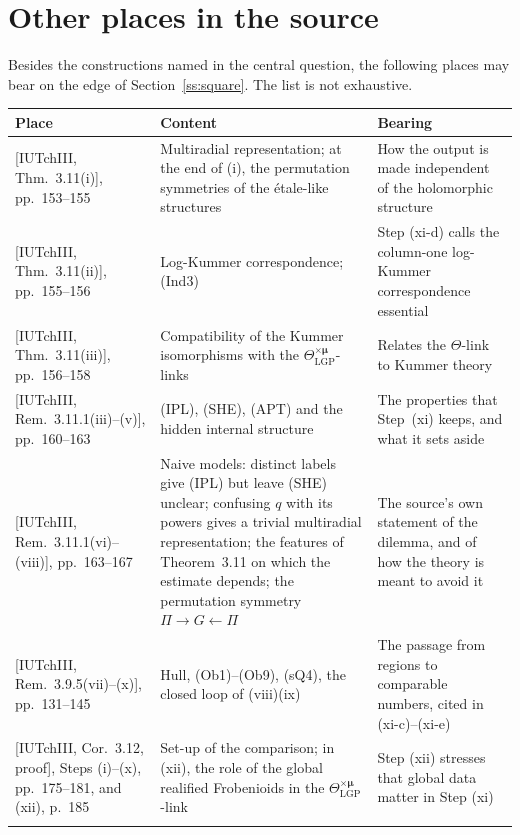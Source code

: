 \documentclass[11pt]{article}
\theoremstyle{definition}
\begin{document}
\section{Other places in the source}\label{s:places}

Besides the constructions named in the central question, the
following places may bear on the edge of Section~\ref{ss:square}.
The list is not exhaustive.

{\small
\begin{longtable}{@{}>{\raggedright\arraybackslash}p{}>{\raggedright\arraybackslash}p{}>{\raggedright\arraybackslash}p{}@{}}
\toprule
Place & Content & Bearing\\
\midrule
\endhead
{}[IUTchIII, Thm.~3.11(i)], pp.~153--155 & Multiradial representation; at the end of (i), the permutation symmetries of the \'etale-like structures & How the output is made independent of the holomorphic structure\\\addlinespace[3pt]
{}[IUTchIII, Thm.~3.11(ii)], pp.~155--156 & Log-Kummer correspondence; (Ind3) & Step (xi-d) calls the column-one log-Kummer correspondence essential\\\addlinespace[3pt]
{}[IUTchIII, Thm.~3.11(iii)], pp.~156--158 & Compatibility of the Kummer isomorphisms with the $\Theta^{\times\boldsymbol\mu}_{\mathrm{LGP}}$-links & Relates the $\Theta$-link to Kummer theory\\\addlinespace[3pt]
{}[IUTchIII, Rem.~3.11.1(iii)--(v)], pp.~160--163 & (IPL), (SHE), (APT) and the hidden internal structure & The properties that Step~(xi) keeps, and what it sets aside\\\addlinespace[3pt]
{}[IUTchIII, Rem.~3.11.1(vi)--(viii)], pp.~163--167 & Naive models: distinct labels give (IPL) but leave (SHE) unclear; confusing $q$ with its powers gives a trivial multiradial representation; the features of Theorem~3.11 on which the estimate depends; the permutation symmetry $\Pi\to G\leftarrow\Pi$ & The source's own statement of the dilemma, and of how the theory is meant to avoid it\\\addlinespace[3pt]
{}[IUTchIII, Rem.~3.9.5(vii)--(x)], pp.~131--145 & Hull, (Ob1)--(Ob9), (sQ4), the closed loop of (viii)(ix) & The passage from regions to comparable numbers, cited in (xi-c)--(xi-e)\\\addlinespace[3pt]
{}[IUTchIII, Cor.~3.12, proof], Steps (i)--(x), pp.~175--181, and (xii), p.~185 & Set-up of the comparison; in (xii), the role of the global realified Frobenioids in the $\Theta^{\times\boldsymbol\mu}_{\mathrm{LGP}}$-link & Step (xii) stresses that global data matter in Step (xi)\\\addlinespace[3pt]

\end{longtable}}
\end{document}
